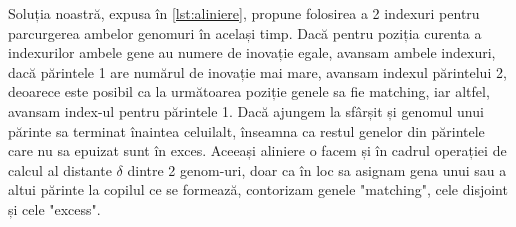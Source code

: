 Soluția noastră, expusa în \ref*{lst:aliniere}, propune folosirea a 2 indexuri pentru parcurgerea ambelor genomuri în același timp. Dacă pentru poziția curenta a indexurilor ambele gene au numere de inovație egale, avansam ambele indexuri, dacă părintele 1 are numărul de inovație mai mare, avansam indexul părintelui 2, deoarece este posibil ca la următoarea poziție genele sa fie matching, iar altfel, avansam index-ul pentru părintele 1.
Dacă ajungem la sfârșit și genomul unui părinte sa terminat înaintea celuilalt, înseamna ca restul genelor din părintele care nu sa epuizat sunt în exces.
Aceeași aliniere o facem și în cadrul operației de calcul al distante $\delta$ dintre 2 genom-uri, doar ca în loc sa asignam gena unui sau a altui părinte la copilul ce se formează, contorizam genele "matching", cele disjoint și cele "excess".


